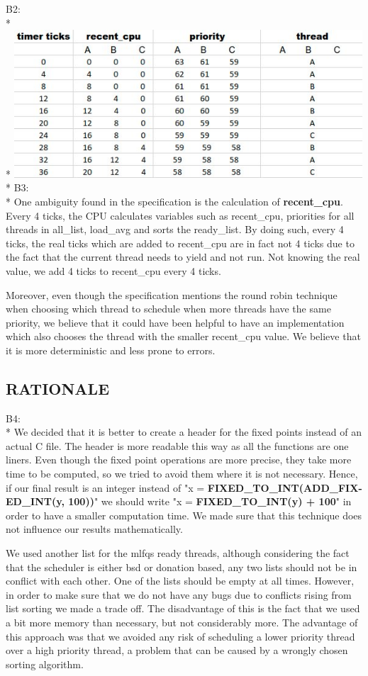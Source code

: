 \documentclass{article}
\begin{document}
B2:\\*\\*
\includegraphics[width=13cm]{img2}
\\*
B3:\\*
One ambiguity found in the specification is the calculation of \textbf{recent\_cpu}. Every 4 ticks, the CPU calculates variables such as recent\_cpu, priorities for all threads in all\_list, load\_avg and sorts the ready\_list.
By doing such, every 4 ticks, the real ticks which are added to recent\_cpu are in fact not 4 ticks due to the fact that the current thread
needs to yield and not run. Not knowing the real value, we add 4 ticks to recent\_cpu every 4 ticks.

Moreover, even though the specification mentions the round robin technique when choosing which thread
to schedule when more threads have the same priority, we believe that it could have been helpful to
have an implementation which also chooses the thread with the smaller recent\_cpu value. We believe that it is more
deterministic and less prone to errors.

\subsection*{RATIONALE}
\justify

B4:\\*
We decided that it is better to create a header for the fixed points instead of an actual C file. The header is more readable this way as all the functions are one liners. Even though the fixed point operations are more precise, they take more time to be computed, so we tried to avoid them where it is not necessary. Hence, if our final result is an integer instead of "x = \textbf{FIXED\_TO\_INT(ADD\_FIX- ED\_INT(y, 100))}" we should write "x = \textbf{FIXED\_TO\_INT(y) + 100}" in order to have a smaller computation time. We made sure that this technique does not influence our results mathematically.

We used another list for the mlfqs ready threads, although considering the fact that the scheduler is either bsd or donation based, any two lists should not be in conflict with each other. One of the lists should be empty at all times. However, in order to make sure that we do not have any bugs due to conflicts rising from list sorting we made a trade off. The disadvantage of this is the fact that we used a bit more memory than necessary, but not considerably more. The advantage of this approach was that we avoided any risk of scheduling a lower priority thread over a high priority thread, a problem that can be caused by a wrongly chosen sorting algorithm.
\end{document}
